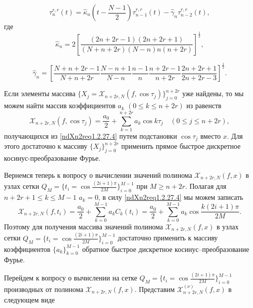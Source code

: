 \begin{equation}\label{ndXn2req1.2.27.9}
\tau_n^{r,r}(t)=
\hat\kappa_n(t-\frac{N-1}{2})\tau_{n-1}^{r,r}(t)-\hat\gamma_n\tau_{n-2}^{r,r}(t),
\end{equation}
где
$$
\hat\kappa_n=2\left[\frac{(2n+2r-1)(2n+2r+1)}{(N+n+2r)
(N-n)n(n+2r)}\right]^\frac12,
$$

$$
\hat\gamma_n=\left[\frac{N+n+2r-1}{N+n+2r}
\frac{N-n+1}{N-n}\frac{n-1}n\frac{n+2r-1}{n+2r}\frac{2n+2r+1}{2n+2r-3}\right]^\frac12.
$$



Если элементы массива $\{X_j=\mathcal{X}_{n+2r,N}(f,\cos\tau_j)\}_{j=0}^{n+2r}$ уже найдены, то мы можем найти массив  коэффициентов $a_k$ $(0\le k\le n+2r)$ из равенств
$$
\mathcal{X}_{n+2r,N}(f,\cos\tau_j)=\frac{a_0}{2}+\sum_{k=1}^{n+2r}a_k\cos k\tau_j \quad(0\le j\le n+2r),
$$
получающихся из \eqref{ndXn2req1.2.27.4} путем подстановки  $\cos\tau_j$ вместо $x$. Для этого достаточно к массиву $\{X_j\}_{j=0}^{n+2r}$ применить прямое быстрое дискретное косинус-преобразование Фурье.





Вернемся теперь к вопросу о  вычислении значений полинома $\mathcal{X}_{n+2r,N}(f,x)$ в узлах сетки $Q_M=\{t_i=\cos\frac{(2i+1)\pi}{2M}\}_{i=0}^{M-1}$ при  $M\ge n+2r$. Полагая для $n+2r+1\le k\le M-1$  $a_k=0$, в силу \eqref{ndXn2req1.2.27.4} мы можем записать
\begin{equation}\label{ndXn2req1.2.27.10}
\mathcal{X}_{n+2r,N}(f,t_i)=\frac{a_0}{2}+\sum_{k=0}^{M-1}a_kC_k(t_i)=\frac{a_0}{2}+\sum_{k=0}^{M-1}a_k\cos \frac{k(2i+1)\pi}{2M}.
\end{equation}
Поэтому для получения массива значений полинома  $\mathcal{X}_{n+2r,N}(f,x)$ в узлах сетки $Q_M=\{t_i=\cos\frac{(2i+1)\pi}{2M}\}_{i=0}^{M-1}$
достаточно применить к массиву коэффициентов $\{a_k\}_{k=0}^{M-1}$ обратное быстрое дискретное косинус--преобразование Фурье.

Перейдем к вопросу о вычислении на сетке $Q_M=\{t_i=\cos\frac{(2i+1)\pi}{2M}\}_{i=0}^{M-1}$ производных от полинома $\mathcal{X}_{n+2r,N}(f,x)$.
Представим  $\mathcal{X}^{(\nu)}_{n+2r,N}(f,x)$  в следующем виде

